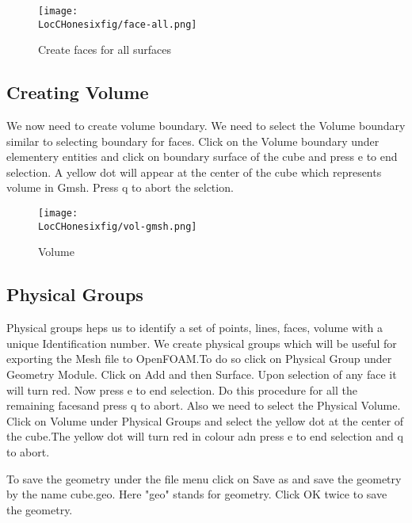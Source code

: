 \begin{figure}[t]  
\begin{center}  
\texttt{[image: \\LocCHonesixfig/face-all.png]}
\caption{Create faces for all surfaces}
\label{face-all}
\end{center}  
\end{figure}

\subsection{Creating Volume}

We now need to create volume boundary. We need to select the Volume boundary similar to selecting boundary for faces. 
Click on the Volume boundary under elementery entities and click on boundary surface of the cube and press e to end selection. A yellow dot will
appear at the center of the cube which represents volume in Gmsh. Press q to abort the selction.

\begin{figure}[t]  
\begin{center}  
\texttt{[image: \\LocCHonesixfig/vol-gmsh.png]}
\caption{Volume}
\label{vol}
\end{center}  
\end{figure}

\subsection{Physical Groups}

Physical groups heps us to identify a set of points, lines, faces, volume with a unique Identification number. We create physical groups which will be useful for exporting the Mesh file to OpenFOAM.To do so click on Physical Group under Geometry Module. Click on Add and then Surface. Upon selection of any face it will turn red. Now press e to end selection. Do this procedure for all the remaining facesand press q to abort. Also we need to select the Physical Volume. Click on Volume under Physical Groups and select the yellow dot at the center of the cube.The yellow dot will turn red in colour adn press e to end selection and q to abort.

To save the geometry under the file menu click on Save as and save the geometry by the name cube.geo. Here "geo" stands for geometry. Click OK twice
to save the geometry. 
